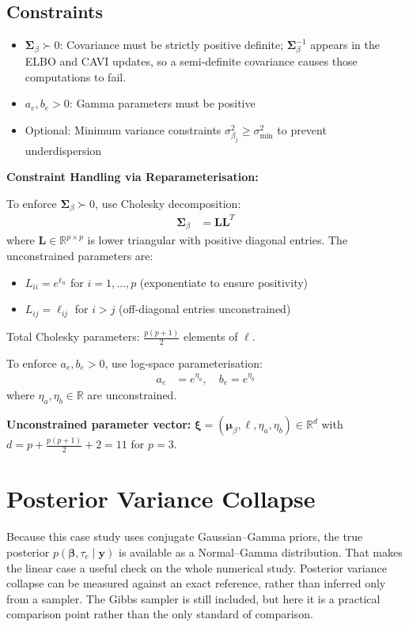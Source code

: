 \documentclass[11pt,a4paper]{article}
\newcommand{\R}{\mathbb{R}}
\begin{document}
\subsection*{Constraints}

\begin{itemize}
\item $\bm{\Sigma}_\beta \succ 0$: Covariance must be strictly positive definite; $\bm{\Sigma}_\beta^{-1}$ appears in the ELBO and CAVI updates, so a semi-definite covariance causes those computations to fail.
\item $a_e, b_e > 0$: Gamma parameters must be positive
\item Optional: Minimum variance constraints $\sigma^2_{\beta_j} \geq \sigma^2_{\text{min}}$ to prevent underdispersion
\end{itemize}

\textbf{Constraint Handling via Reparameterisation:}

To enforce $\bm{\Sigma}_\beta \succ 0$, use Cholesky decomposition:
\begin{align}
\bm{\Sigma}_\beta &= \bm{L}\bm{L}^T
\end{align}
where $\bm{L} \in \R^{p \times p}$ is lower triangular with positive diagonal entries. The unconstrained parameters are:
\begin{itemize}
\item $L_{ii} = e^{\ell_{ii}}$ for $i=1,\ldots,p$ (exponentiate to ensure positivity)
\item $L_{ij} = \ell_{ij}$ for $i > j$ (off-diagonal entries unconstrained)
\end{itemize}

Total Cholesky parameters: $\frac{p(p+1)}{2}$ elements of $\bm{\ell}$.

To enforce $a_e, b_e > 0$, use log-space parameterisation:
\begin{align}
a_e &= e^{\eta_a}, \quad b_e = e^{\eta_b}
\end{align}
where $\eta_a, \eta_b \in \R$ are unconstrained.

\textbf{Unconstrained parameter vector:} $\bm{\xi} = (\bm{\mu}_\beta, \bm{\ell}, \eta_a, \eta_b) \in \R^d$ with $d = p + \frac{p(p+1)}{2} + 2 = 11$ for $p=3$.

\section{Posterior Variance Collapse}
\label{sec:posterior-variance-collapse}

Because this case study uses conjugate Gaussian--Gamma priors, the true posterior $p(\bm{\beta}, \tau_e \mid \bm{y})$ is available as a Normal--Gamma distribution. That makes the linear case a useful check on the whole numerical study. Posterior variance collapse can be measured against an exact reference, rather than inferred only from a sampler. The Gibbs sampler is still included, but here it is a practical comparison point rather than the only standard of comparison.
\end{document}
